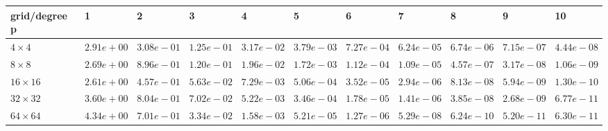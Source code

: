 \begin{tabular}{lllllllllll}
\hline
 grid/degree p   & 1          & 2          & 3          & 4          & 5          & 6          & 7          & 8          & 9          & 10         \\
\hline
 $4 \times 4$    & $2.91e+00$ & $3.08e-01$ & $1.25e-01$ & $3.17e-02$ & $3.79e-03$ & $7.27e-04$ & $6.24e-05$ & $6.74e-06$ & $7.15e-07$ & $4.44e-08$ \\
 $8 \times 8$    & $2.69e+00$ & $8.96e-01$ & $1.20e-01$ & $1.96e-02$ & $1.72e-03$ & $1.12e-04$ & $1.09e-05$ & $4.57e-07$ & $3.17e-08$ & $1.06e-09$ \\
 $16 \times 16$  & $2.61e+00$ & $4.57e-01$ & $5.63e-02$ & $7.29e-03$ & $5.06e-04$ & $3.52e-05$ & $2.94e-06$ & $8.13e-08$ & $5.94e-09$ & $1.30e-10$ \\
 $32 \times 32$  & $3.60e+00$ & $8.04e-01$ & $7.02e-02$ & $5.22e-03$ & $3.46e-04$ & $1.78e-05$ & $1.41e-06$ & $3.85e-08$ & $2.68e-09$ & $6.77e-11$ \\
 $64 \times 64$  & $4.34e+00$ & $7.01e-01$ & $3.34e-02$ & $1.58e-03$ & $5.21e-05$ & $1.27e-06$ & $5.29e-08$ & $6.24e-10$ & $5.20e-11$ & $6.30e-11$ \\
\hline
\end{tabular}